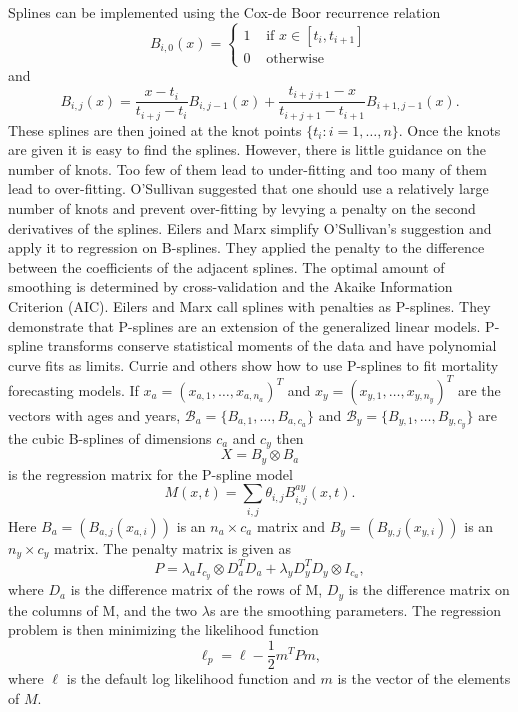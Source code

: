 \documentclass{article}
\numberwithin{equation}{section}
\begin{document}
Splines can be implemented using the Cox-de Boor recurrence relation
\cite{de1978practical}
\begin{equation}\label{s13e1}
B_{i,0}(x) = \begin{cases}
1 & \text{ if } x \in [t_i, t_{i+1}] \\
0 & \text{ otherwise}
\end{cases}
\end{equation}
and
\begin{equation}\label{s13e2}
B_{i,j}(x) = \frac{x - t_i}{t_{i+j} - t_i}B_{i,j-1}(x) + 
\frac{t_{i+j+1}-x}{t_{i+j+1}-t_{i+1}}B_{i+1,j-1}(x).
\end{equation}
These splines are then joined at the knot points $\{t_i: i = 1, \ldots, n\}$.
Once the knots are given it is easy to find the splines. However, there is
little guidance on the number of knots. Too few of them lead to under-fitting
and too many of them lead to over-fitting. O'Sullivan \cite{o1986statistical}
suggested that one should use a relatively large number of knots and prevent
over-fitting by levying a penalty on the second derivatives of the splines.
Eilers and Marx \cite{eilers1996flexible} simplify O'Sullivan's suggestion
and apply it to regression on B-splines. They applied the penalty to the
difference between the coefficients of the adjacent splines. The optimal amount
of smoothing is determined by cross-validation and the Akaike Information 
Criterion (AIC). Eilers and Marx call splines with penalties as P-splines.
They demonstrate that P-splines are an extension of the generalized linear
models. P-spline transforms conserve statistical moments of the data and have
polynomial curve fits as limits. Currie and others \cite{currie2004smoothing}
show how to use P-splines to fit mortality forecasting models. If $x_a = (
x_{a,1},\ldots,x_{a,n_a})^T$ and $x_y=(x_{y,1},\ldots,x_{y,n_y})^T$ are the
vectors with ages and years, $\mathcal{B}_a = \{B_{a,1}, \ldots, B_{a, c_a}\}$
and $\mathcal{B}_y = \{B_{y,1},\ldots,B_{y, c_y}\}$ are the cubic B-splines of
dimensions $c_a$ and $c_y$ then
\begin{equation}\label{c14e1}
X = B_y \otimes B_a
\end{equation}
is the regression matrix for the P-spline model
\begin{equation}\label{c14e2}
M(x,t) = \sum_{i,j}\theta_{i,j}B_{i,j}^{ay}(x, t).
\end{equation}
Here $B_a =(B_{a,j}(x_{a,i}))$ is an $n_a \times c_a$ matrix and $B_y = 
(B_{y,j}(x_{y,i}))$ is an $n_y \times c_y$ matrix. The penalty matrix is given
as
\begin{equation}\label{c14e3}
P = \lambda_aI_{c_y} \otimes D_a^TD_a + \lambda_y D_y^TD_y\otimes I_{c_a},
\end{equation}
where $D_a$ is the difference matrix of the rows of M, $D_y$ is the difference
matrix on the columns of M, and the two $\lambda$s are the smoothing parameters.
The regression problem is then minimizing the likelihood function
\begin{equation}\label{c14e4}
\ell_p = \ell - \frac{1}{2} m^TPm,
\end{equation}
where $\ell$ is the default log likelihood function and $m$ is the vector of
the elements of $M$.
\end{document}
